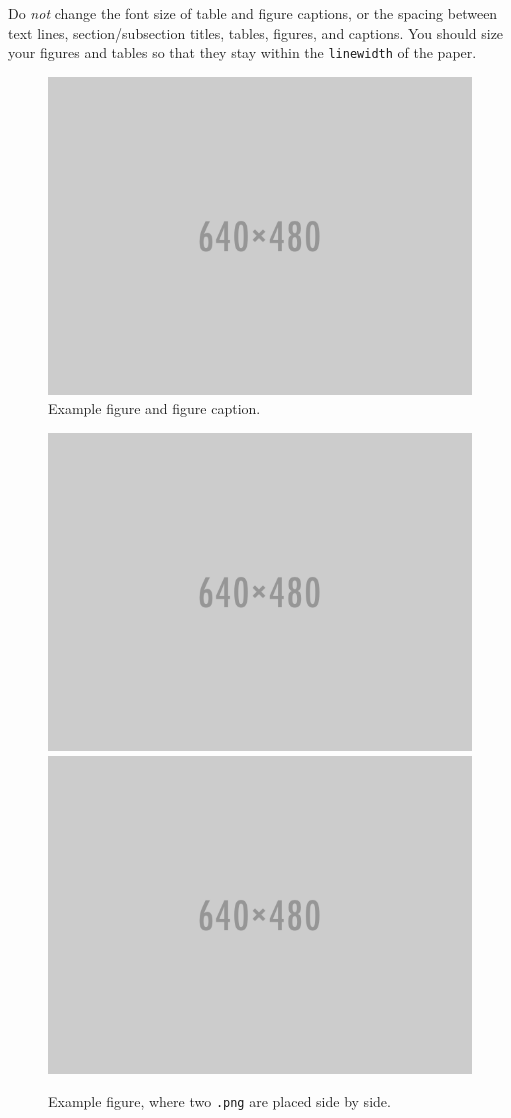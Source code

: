 \documentclass{anthology-ch}         %
\begin{document}
Do \textit{not} change the font size of table and figure captions, or the spacing between text lines, section/subsection titles, tables, figures, and captions. You should size your figures and tables so that they stay within the \texttt{linewidth} of the paper. 

\begin{figure}[t!]
  \centering
  \includegraphics[width=0.4\linewidth]{640x480.png}
  \caption{Example figure and figure caption.}
  \label{fig:example}
\end{figure}

\begin{figure}[t!]
  \centering
  \includegraphics[width=0.4\linewidth]{640x480.png}
  \includegraphics[width=0.4\linewidth]{640x480.png}
  \caption{Example figure, where two \texttt{.png} are placed side by side.}
  \label{fig:example_bigger}
\end{figure}

%
\end{document}
